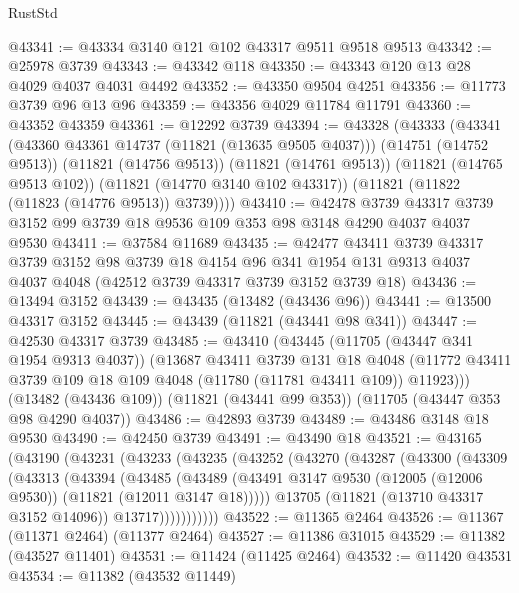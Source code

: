 \begin{lexlean}{RustStd}
\begin{coremodule}
@43341 := @43334 @3140 @121 @102 @43317 @9511 @9518 @9513
@43342 := @25978 @3739
@43343 := @43342 @118
@43350 := @43343 @120 @13 @28 @4029 @4037 @4031 @4492
@43352 := @43350 @9504 @4251
@43356 := @11773 @3739 @96 @13 @96
@43359 := @43356 @4029 @11784 @11791
@43360 := @43352 @43359
@43361 := @12292 @3739
@43394 := @43328
    (@43333
      (@43341
        (@43360 @43361 @14737 (@11821 (@13635 @9505 @4037)))
        (@14751 (@14752 @9513))
        (@11821 (@14756 @9513))
        (@11821 (@14761 @9513))
        (@11821 (@14765 @9513 @102))
        (@11821 (@14770 @3140 @102 @43317))
        (@11821 (@11822 (@11823 (@14776 @9513)) @3739))))
@43410 := @42478
    @3739
    @43317
    @3739
    @3152
    @99
    @3739
    @18
    @9536
    @109
    @353
    @98
    @3148
    @4290
    @4037
    @4037
    @9530
@43411 := @37584 @11689
@43435 := @42477
    @43411
    @3739
    @43317
    @3739
    @3152
    @98
    @3739
    @18
    @4154
    @96
    @341
    @1954
    @131
    @9313
    @4037
    @4037
    @4048
    (@42512 @3739 @43317 @3739 @3152 @3739 @18)
@43436 := @13494 @3152
@43439 := @43435 (@13482 (@43436 @96))
@43441 := @13500 @43317 @3152
@43445 := @43439 (@11821 (@43441 @98 @341))
@43447 := @42530 @43317 @3739
@43485 := @43410
    (@43445
      (@11705 (@43447 @341 @1954 @9313 @4037))
      (@13687
        @43411
        @3739
        @131
        @18
        @4048
        (@11772 @43411 @3739 @109 @18 @109 @4048 (@11780 (@11781 @43411 @109)) @11923)))
    (@13482 (@43436 @109))
    (@11821 (@43441 @99 @353))
    (@11705 (@43447 @353 @98 @4290 @4037))
@43486 := @42893 @3739
@43489 := @43486 @3148 @18 @9530
@43490 := @42450 @3739
@43491 := @43490 @18
@43521 := @43165
    (@43190
      (@43231
        (@43233
          (@43235
            (@43252
              (@43270
                (@43287
                  (@43300
                    (@43309
                      (@43313
                        (@43394
                          (@43485
                            (@43489
                              (@43491
                                @3147
                                @9530
                                (@12005 (@12006 @9530))
                                (@11821 (@12011 @3147 @18)))))
                          @13705
                          (@11821 (@13710 @43317 @3152 @14096))
                          @13717)))))))))))
@43522 := @11365 @2464
@43526 := @11367 (@11371 @2464) (@11377 @2464)
@43527 := @11386 @31015
@43529 := @11382 (@43527 @11401)
@43531 := @11424 (@11425 @2464)
@43532 := @11420 @43531
@43534 := @11382 (@43532 @11449)

\end{coremodule}
\end{lexlean}

